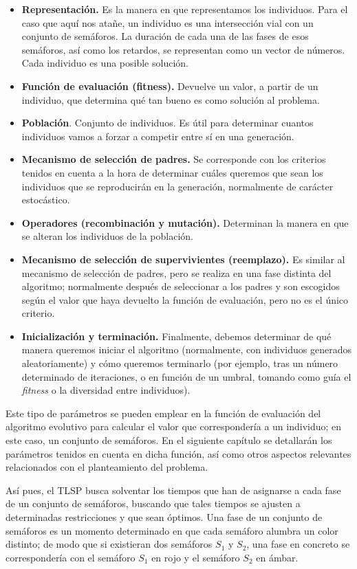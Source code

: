\begin{itemize}
    \item \textbf{Representación.} Es la manera en que representamos los individuos. Para el caso que aquí nos atañe, un individuo es una intersección vial con un conjunto de semáforos. La duración de cada una de las fases de esos semáforos, así como los retardos, se representan como un vector de números. Cada individuo es una posible solución.
    \item \textbf{Función de evaluación (fitness).} Devuelve un valor, a partir de un individuo, que determina qué tan bueno es como solución al problema.
    \item \textbf{Población}. Conjunto de individuos. Es útil para determinar cuantos individuos vamos a forzar a competir entre sí en una generación.
    \item \textbf{Mecanismo de selección de padres.} Se corresponde con los criterios tenidos en cuenta a la hora de determinar cuáles queremos que sean los individuos que se reproducirán en la generación, normalmente de carácter estocástico.
    \item \textbf{Operadores (recombinación y mutación).} Determinan la manera en que se alteran los individuos de la población.
    \item \textbf{Mecanismo de selección de supervivientes (reemplazo).} Es similar al mecanismo de selección de padres, pero se realiza en una fase distinta del algoritmo; normalmente después de seleccionar a los padres y son escogidos según el valor que haya devuelto la función de evaluación, pero no es el único criterio.
    \item \textbf{Inicialización y terminación.} Finalmente, debemos determinar de qué manera queremos iniciar el algoritmo (normalmente, con individuos generados aleatoriamente) y cómo queremos terminarlo (por ejemplo, tras un número determinado de iteraciones, o en función de un umbral, tomando como guía el \textit{fitness} o la diversidad entre individuos).
\end{itemize}


Este tipo de parámetros se pueden emplear en la función de evaluación del algoritmo evolutivo para calcular el valor que correspondería a un individuo; en este caso, un conjunto de semáforos. En el siguiente capítulo se detallarán los parámetros tenidos en cuenta en dicha función, así como otros aspectos relevantes relacionados con el planteamiento del problema.

Así pues, el TLSP busca solventar los tiempos que han de asignarse a cada fase de un conjunto de semáforos, buscando que tales tiempos se ajusten a determinadas restricciones y que sean óptimos. Una fase de un conjunto de semáforos es un momento determinado en que cada semáforo alumbra un color distinto; de modo que si existieran dos semáforos $S_1$ y $S_2$, una fase en concreto se correspondería con el semáforo $S_1$ en rojo y el semáforo $S_2$ en ámbar.


